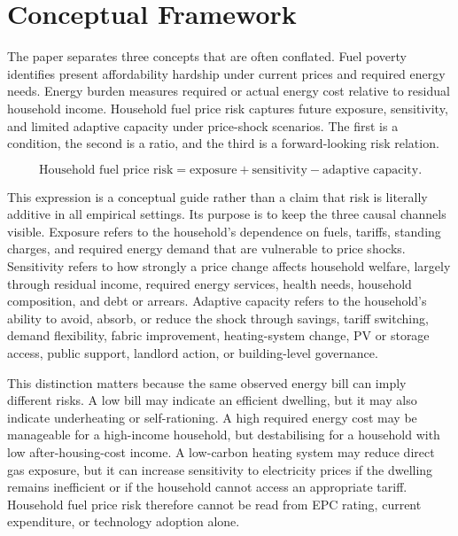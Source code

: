 \section{Conceptual Framework}

The paper separates three concepts that are often conflated. Fuel poverty identifies present affordability hardship under current prices and required energy needs. Energy burden measures required or actual energy cost relative to residual household income. Household fuel price risk captures future exposure, sensitivity, and limited adaptive capacity under price-shock scenarios. The first is a condition, the second is a ratio, and the third is a forward-looking risk relation.

\begin{equation}
\text{Household fuel price risk} = \text{exposure} + \text{sensitivity} - \text{adaptive capacity}.
\end{equation}

This expression is a conceptual guide rather than a claim that risk is literally additive in all empirical settings. Its purpose is to keep the three causal channels visible. Exposure refers to the household's dependence on fuels, tariffs, standing charges, and required energy demand that are vulnerable to price shocks. Sensitivity refers to how strongly a price change affects household welfare, largely through residual income, required energy services, health needs, household composition, and debt or arrears. Adaptive capacity refers to the household's ability to avoid, absorb, or reduce the shock through savings, tariff switching, demand flexibility, fabric improvement, heating-system change, PV or storage access, public support, landlord action, or building-level governance.

This distinction matters because the same observed energy bill can imply different risks. A low bill may indicate an efficient dwelling, but it may also indicate underheating or self-rationing. A high required energy cost may be manageable for a high-income household, but destabilising for a household with low after-housing-cost income. A low-carbon heating system may reduce direct gas exposure, but it can increase sensitivity to electricity prices if the dwelling remains inefficient or if the household cannot access an appropriate tariff. Household fuel price risk therefore cannot be read from EPC rating, current expenditure, or technology adoption alone.

